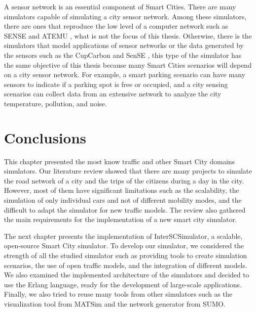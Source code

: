 A sensor network is an essential component of Smart Cities. There are many simulators capable of simulating a city sensor network. Among these simulators, there are ones that reproduce the low level of a computer network such as SENSE \citep{chen2005sense} and ATEMU \citep{polley2004atemu}, what is not the focus of this thesis. Otherwise, there is the simulators that model applications of sensor networks or the data generated by the sensors such as the CupCarbon \citep{mehdi2014cupcarbon} and SenSE \citep{zyrianoff2017sense}, this type of the simulator has the same objective of this thesis because many Smart Cities scenarios will depend on a city sensor network. For example, a smart parking scenario can have many sensors to indicate if a parking spot is free or occupied, and a city sensing scenarios can collect data from an extensive network to analyze the city temperature, pollution, and noise.

\section{Conclusions}
\label{sec:rel_conclusoes}

This chapter presented the most know traffic and other Smart City domains simulators. Our literature review showed that there are many projects to simulate the road network of a city and the trips of the citizens during a day in the city. However, most of them have significant limitations such as the scalability, the simulation of only individual cars and not of different mobility modes, and the difficult to adapt the simulator for new traffic models. The review also gathered the main requirements for the implementation of a new smart city simulator.

The next chapter presents the implementation of InterSCSimulator, a scalable, open-source Smart City simulator. To develop our simulator, we considered the strength of all the studied simulator such as providing tools to create simulation scenarios, the use of open traffic models, and the integration of different models. We also examined the implemented architecture of the simulators and decided to use the Erlang language, ready for the development of large-scale applications. Finally, we also tried to reuse many tools from other simulators such as the visualization tool from MATSim and the network generator from SUMO.